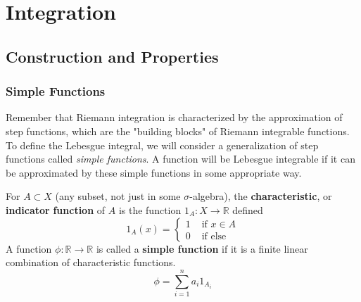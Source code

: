\documentclass{article}
\begin{document}
\section{Integration}

  \subsection{Construction and Properties}

    \subsubsection{Simple Functions}

      Remember that Riemann integration is characterized by the approximation of step functions, which are the "building blocks" of Riemann integrable functions. To define the Lebesgue integral, we will consider a generalization of step functions called \textit{simple functions}. A function will be Lebesgue integrable if it can be approximated by these simple functions in some appropriate way. 

      \begin{definition}
        For $A \subset X$ (any subset, not just in some $\sigma$-algebra), the \textbf{characteristic}, or \textbf{indicator} \textbf{function} of $A$ is the function $1_A : X \longrightarrow \mathbb{R}$ defined 
        \begin{equation}
          1_A (x) = \begin{cases} 1 & \text{ if } x \in A \\ 0 & \text{ if else} \end{cases}
        \end{equation}
        A function $\phi: \mathbb{R} \longrightarrow \mathbb{R}$ is called a \textbf{simple function} if it is a finite linear combination of characteristic functions. 
        \begin{equation}
          \phi = \sum_{i=1}^n a_i 1_{A_i}
        \end{equation}
      \end{definition}
\end{document}
